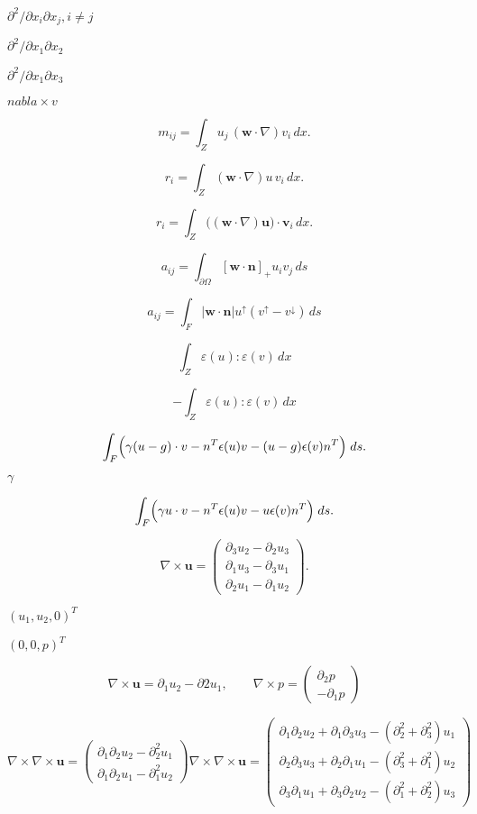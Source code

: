\documentclass{article}
\begin{document}
$\partial^2/\partial x_i \partial x_j, i\neq j$
\pagebreak

$\partial^2/\partial x_1 \partial x_2$
\pagebreak

$\partial^2/\partial x_1 \partial x_3$
\pagebreak

$nabla \times v$
\pagebreak

\[ m_{ij} = \int_Z u_j\,(\mathbf w \cdot \nabla) v_i \, dx. \]
\pagebreak

\[ r_i = \int_Z (\mathbf w \cdot \nabla)u\, v_i \, dx. \]
\pagebreak

\[ r_i = \int_Z \bigl((\mathbf w \cdot \nabla) \mathbf u\bigr) \cdot\mathbf v_i \, dx. \]
\pagebreak

\[ a_{ij} = \int_{\partial\Omega} [\mathbf w\cdot\mathbf n]_+ u_i v_j \, ds \]
\pagebreak

\[ a_{ij} = \int_F \left|\mathbf w \cdot \mathbf n\right| u^\uparrow (v^\uparrow-v^\downarrow) \,ds \]
\pagebreak

\[ \int_Z \varepsilon(u): \varepsilon(v)\,dx \]
\pagebreak

\[ - \int_Z \varepsilon(u): \varepsilon(v) \,dx \]
\pagebreak

\[ \int_F \Bigl(\gamma (u-g) \cdot v - n^T \epsilon(u) v - (u-g) \epsilon(v) n^T\Bigr)\;ds. \]
\pagebreak

$\gamma$
\pagebreak

\[ \int_F \Bigl(\gamma u \cdot v - n^T \epsilon(u) v - u \epsilon(v) n^T\Bigr)\;ds. \]
\pagebreak

\[ \nabla\times \mathbf u = \begin{pmatrix} \partial_3 u_2 - \partial_2 u_3 \\ \partial_1 u_3 - \partial_3 u_1 \\ \partial_2 u_1 - \partial_1 u_2 \end{pmatrix}. \]
\pagebreak

$(u_1, u_2, 0)^T$
\pagebreak

$(0,0,p)^T$
\pagebreak

\[ \nabla \times \mathbf u = \partial_1 u_2 - \partial 2 u_1, \qquad \nabla \times p = \begin{pmatrix} \partial_2 p \\ -\partial_1 p \end{pmatrix} \]
\pagebreak

\[ \nabla\times\nabla\times \mathbf u = \begin{pmatrix} \partial_1\partial_2 u_2 - \partial_2^2 u_1 \\ \partial_1\partial_2 u_1 - \partial_1^2 u_2 \end{pmatrix} \nabla\times\nabla\times \mathbf u = \begin{pmatrix} \partial_1\partial_2 u_2 + \partial_1\partial_3 u_3 - (\partial_2^2+\partial_3^2) u_1 \\ \partial_2\partial_3 u_3 + \partial_2\partial_1 u_1 - (\partial_3^2+\partial_1^2) u_2 \\ \partial_3\partial_1 u_1 + \partial_3\partial_2 u_2 - (\partial_1^2+\partial_2^2) u_3 \end{pmatrix} \]
\pagebreak
\end{document}
